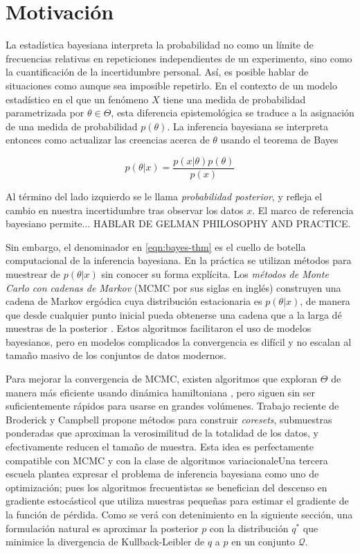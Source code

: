 \documentclass[main.tex]{subfiles}
\begin{document}
\chapter*{Motivación}
La estadística bayesiana interpreta la probabilidad no como un límite de frecuencias relativas en repeticiones independientes de un experimento, sino como la cuantificación de la incertidumbre personal. Así, es posible hablar de situaciones como  aunque sea imposible repetirlo. En el contexto de un modelo estadístico en el que un fenómeno $X$ tiene una medida de probabilidad parametrizada por $\theta \in \Theta$, esta diferencia epistemológica se traduce a la asignación de una medida de probabilidad $p(\theta)$. La inferencia bayesiana se interpreta entonces como actualizar las creencias acerca de $\theta$ usando el teorema de Bayes

\begin{equation}
	p(\theta | x) = \frac{p(x|\theta)p(\theta)}{p(x)}
	\label{eqn:bayes-thm}	
\end{equation}

Al término del lado izquierdo se le llama \textit{probabilidad posterior}, y refleja el cambio en nuestra incertidumbre tras observar los datos $x$. El marco de referencia bayesiano permite... {\color{red}HABLAR DE GELMAN PHILOSOPHY AND PRACTICE.}

Sin embargo, el denominador en \eqref{eqn:bayes-thm} es el cuello de botella computacional de la inferencia bayesiana. En la práctica se utilizan métodos para muestrear de $p(\theta |x)$ sin conocer su forma explícita. Los \textit{métodos de Monte Carlo con cadenas de Markov} (MCMC por sus siglas en inglés) construyen una cadena de Markov ergódica cuya distribución estacionaria es $p(\theta | x)$, de manera que desde cualquier punto inicial pueda obtenerse una cadena que a la larga dé muestras de la posterior \cite{robert-book}. Estos algoritmos facilitaron el uso de modelos bayesianos, pero en modelos complicados la convergencia es difícil y no escalan al tamaño masivo de los conjuntos de datos modernos.

Para mejorar la convergencia de MCMC, existen algoritmos que exploran $\Theta$ de manera más eficiente usando dinámica hamiltoniana \cite{betancourt-hmc}, pero siguen sin ser suficientemente rápidos para usarse en grandes volúmenes.  
Trabajo reciente de Broderick y Campbell \cite{coresets, coresets-greedy} propone métodos para construir \textit{coresets}, submuestras ponderadas que aproximan la verosimilitud de la totalidad de los datos, y efectivamente reducen el tamaño de muestra. Esta idea es perfectamente compatible con MCMC y con la clase de algoritmos variacionaleUna tercera escuela plantea expresar el problema de inferencia bayesiana como uno de optimización; pues los algoritmos frecuentistas se benefician del descenso en gradiente estocásticol que utiliza muestras pequeñas para estimar el gradiente \cite{goodfellow} de la función de pérdida. Como se verá con detenimiento en la siguiente sección, una formulación natural es aproximar la posterior $p$ con la distribución $q^*$ que minimice la divergencia de Kullback-Leibler de $q$ a $p$ en un conjunto $\mathcal{Q}$. 
\end{document}
